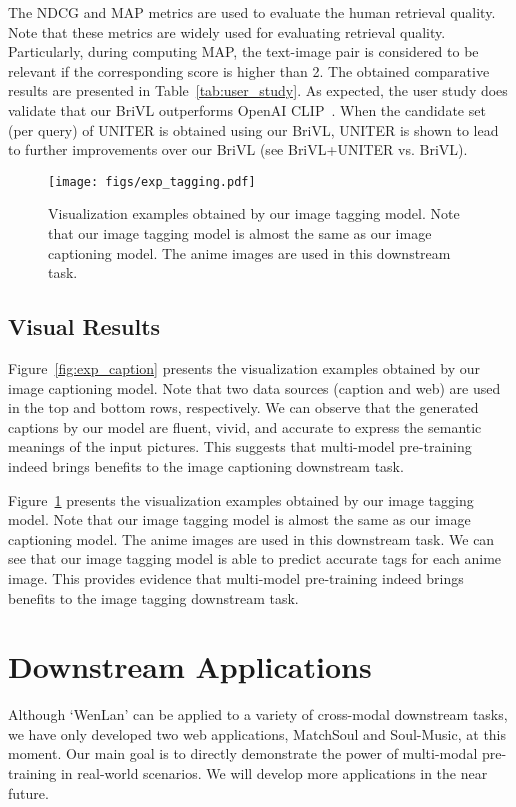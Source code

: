 \documentclass[10pt,twocolumn,letterpaper]{article}
\begin{document}
The NDCG and MAP metrics are used to evaluate the human retrieval quality. Note that these metrics are widely used for evaluating retrieval quality. Particularly, during computing MAP, the text-image pair is considered to be relevant if the corresponding score is higher than 2. The obtained comparative results are presented in Table~\ref{tab:user_study}. As expected, the user study does validate that our BriVL outperforms OpenAI CLIP~\cite{radford2021learning}. When the candidate set (per query) of UNITER is obtained using our BriVL, UNITER is shown to lead to further improvements over our BriVL (see BriVL+UNITER vs. BriVL).

\begin{figure}[t]
    \centering
    \texttt{[image: figs/exp\_tagging.pdf]}
\caption{
    Visualization examples obtained by our image tagging model. Note that our image tagging model is almost the same as our image captioning model. The anime images are used in this downstream task.}
    \label{fig:exp_tagging}
\end{figure}

\subsection{Visual Results}

Figure~\ref{fig:exp_caption} presents the visualization  examples obtained by our image captioning model. Note that two data sources (caption and web) are used in the top and bottom rows, respectively. We can observe that the generated captions by our model are fluent, vivid, and accurate to express the semantic meanings of the input pictures. This suggests that multi-model pre-training indeed brings benefits to the image captioning downstream task. 

Figure~\ref{fig:exp_tagging} presents the visualization examples obtained by our image tagging model. Note that our image tagging model is almost the same as our image captioning model. The anime images are used in this downstream task. We can see that our image tagging model is able to predict accurate tags for each anime image. This provides evidence that multi-model pre-training indeed brings benefits to the image tagging downstream task. 

\section{Downstream Applications}

Although `WenLan' can be applied to a variety of cross-modal downstream tasks, we have only developed two web applications, MatchSoul and Soul-Music, at this moment. Our main goal is to directly demonstrate the power of multi-modal pre-training in real-world scenarios. We will develop more applications in the near future. 
\end{document}
